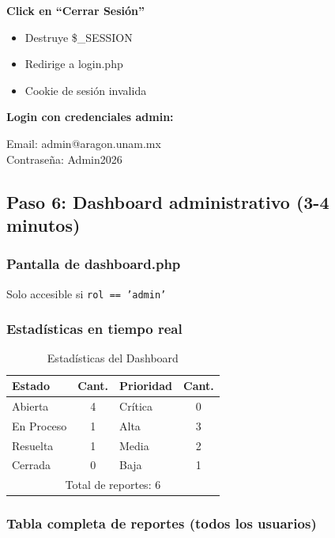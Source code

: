 \documentclass[12pt, a4paper, spanish]{article}
\begin{document}
\textbf{Click en ``Cerrar Sesión''}

\begin{itemize}
    \item Destruye \$\_SESSION
    \item Redirige a login.php
    \item Cookie de sesión invalida
\end{itemize}

\textbf{Login con credenciales admin:}

\begin{tcolorbox}[colback=codeBg, colframe=gris!50]
Email: admin@aragon.unam.mx \\
Contraseña: Admin2026
\end{tcolorbox}

\subsection{Paso 6: Dashboard administrativo (3-4 minutos)}

\subsubsection{Pantalla de dashboard.php}

Solo accesible si \texttt{rol == 'admin'}

\subsubsection{Estadísticas en tiempo real}

\begin{table}[H]
\centering
\caption{Estadísticas del Dashboard}
\small
\begin{tabular}{|l|c|l|c|}
\hline
\textbf{Estado} & \textbf{Cant.} & \textbf{Prioridad} & \textbf{Cant.} \\
\hline
Abierta & 4 & Crítica & 0 \\
En Proceso & 1 & Alta & 3 \\
Resuelta & 1 & Media & 2 \\
Cerrada & 0 & Baja & 1 \\
\hline
\multicolumn{4}{|c|}{Total de reportes: 6} \\
\hline
\end{tabular}
\end{table}

\subsubsection{Tabla completa de reportes (todos los usuarios)}
\end{document}
